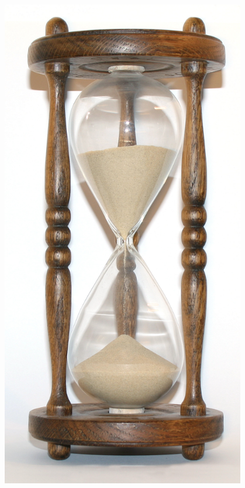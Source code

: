 \documentclass[xcolor=dvipsnames]{beamer}
\begin{document}
\begin{frame}
\begin{columns}[t]
\begin{column}{5cm}
\begin{figure}[htp]
\includegraphics[scale=0.08]{img/hourglass.jpg}
\label{}
\end{figure}
  \end{column}
  
  \begin{column}{5cm}
 

\end{column}
\end{columns}
\end{frame}
\end{document}
